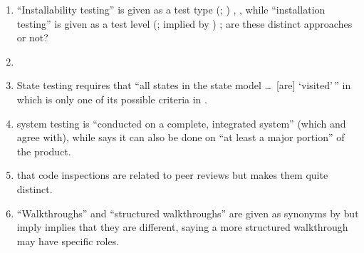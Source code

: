\begin{enumerate}
    \item %
          ``Installability testing'' is given as a test type
          \ifnotpaper
              (\citealp[p.~22]{IEEE2022}; \citeyear[p.~38]{IEEE2021})%
          \else
              \cite[p.~22]{IEEE2022}, \cite[p.~38]{IEEE2021}%
          \fi, while ``installation testing'' is given as a test level
          \ifnotpaper
              (\citealp[p.~439]{vanVliet2000}; implied by
              \citealp[p.~5-8]{SWEBOK2024})%
          \else
              \cite[p.~439]{vanVliet2000}%
          \fi; are these distinct approaches or not?%
    \item %
          \loadDiscrep{}
    \item %
          State testing requires that ``all states in the state model
          \dots\ [are] `visited'\,'' in \citep[p.~19]{IEEE2021} which
          is only one of its possible criteria in \citep[pp.~82-83]{Patton2006}.
    \item %
           \citet[p.~456]{IEEE2017}  system
          testing is ``conducted on a complete, integrated system'' (which
          \citet[Tab.~12.3]{PetersAndPedrycz2000} and
          \citet[p.~439]{vanVliet2000} agree with), while
          \citet[p.~109]{Patton2006} says it can also be done on ``at least a
          major portion'' of the product.
    \item %
           \citetISTQB{}  that code inspections
          are related to peer reviews but \citet[pp.~94-95]{Patton2006} makes
          them quite distinct.
    \item %
           \label{walkthrough-syns}
          ``Walkthroughs'' and ``structured walkthroughs'' are given
          as synonyms by \citetISTQB{} but \citet[p.~484]{PetersAndPedrycz2000}
          \ifnotpaper imply \else implies \fi that they are different, saying a
          more structured walkthrough may have specific roles.

\end{enumerate}
